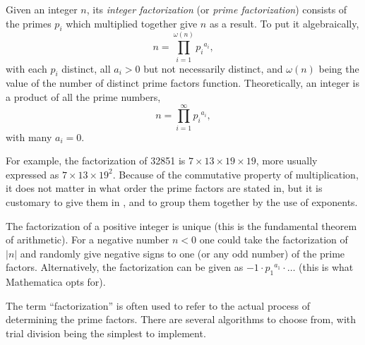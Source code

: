\documentclass[12pt]{article}
\begin{document}
Given an integer $n$, its {\em integer factorization} (or {\em prime factorization}) consists of the primes $p_i$ which multiplied together give $n$ as a result. To put it algebraically, $$n = \prod_{i = 1}^{\omega(n)} {p_i}^{a_i},$$ with each $p_i$ distinct, all $a_i > 0$ but not necessarily distinct, and $\omega(n)$ being the value of the number of distinct prime factors function. Theoretically, an integer is a product of all the prime numbers, $$n = \prod_{i = 1}^{\infty} {p_i}^{a_i},$$ with many $a_i = 0$.

For example, the factorization of 32851 is $7 \times 13 \times 19 \times 19$, more usually expressed as $7 \times 13 \times 19^2$. Because of the commutative property of multiplication, it does not matter in what order the prime factors are stated in, but it is customary to give them in , and to group them together by the use of exponents.

The factorization of a positive integer is unique (this is the fundamental theorem of arithmetic). For a negative number $n < 0$ one could take the factorization of $|n|$ and randomly give negative signs to one (or any odd number) of the prime factors. Alternatively, the factorization can be given as $-1 \cdot {p_1}^{a_1} \cdot \ldots$ (this is what Mathematica opts for).

The term ``factorization'' is often used to refer to the actual process of determining the prime factors. There are several algorithms to choose from, with trial division being the simplest to implement.
\end{document}
